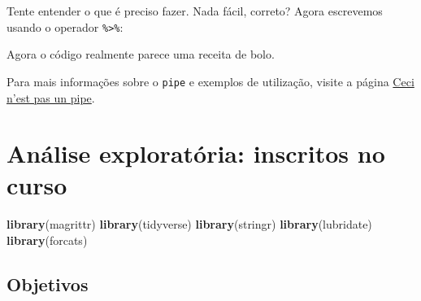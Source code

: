 \documentclass[]{book}
\newenvironment{Shaded}{\begin{snugshade}}{\end{snugshade}}
\newcommand{\KeywordTok}[1]{\textcolor[rgb]{0.13,0.29,0.53}{\textbf{{#1}}}}
\newcommand{\DataTypeTok}[1]{\textcolor[rgb]{0.13,0.29,0.53}{{#1}}}
\newcommand{\DecValTok}[1]{\textcolor[rgb]{0.00,0.00,0.81}{{#1}}}
\newcommand{\StringTok}[1]{\textcolor[rgb]{0.31,0.60,0.02}{{#1}}}
\newcommand{\NormalTok}[1]{{#1}}
\begin{document}
Tente entender o que é preciso fazer. Nada fácil, correto? Agora
escrevemos usando o operador \texttt{\%\textgreater{}\%}:

\begin{Shaded}
\end{Shaded}

Agora o código realmente parece uma receita de bolo.

Para mais informações sobre o \texttt{pipe} e exemplos de utilização,
visite a página
\href{http://cran.r-project.org/web/packages/magrittr/vignettes/magrittr.html}{Ceci
n'est pas un pipe}.

\chapter{Análise exploratória: inscritos no curso}\label{inscritos}

\begin{Shaded}
\begin{Highlighting}[]
\KeywordTok{library}\NormalTok{(magrittr)}
\KeywordTok{library}\NormalTok{(tidyverse)}
\KeywordTok{library}\NormalTok{(stringr)}
\KeywordTok{library}\NormalTok{(lubridate)}
\KeywordTok{library}\NormalTok{(forcats)}
\end{Highlighting}
\end{Shaded}

\section{Objetivos}\label{objetivos}
\end{document}
